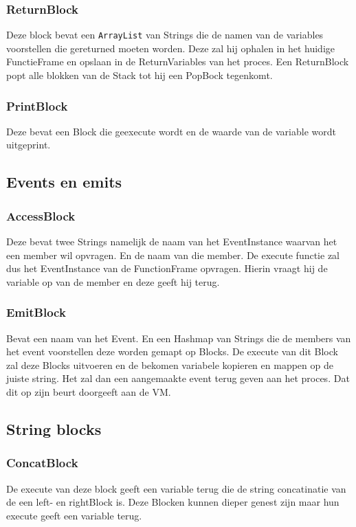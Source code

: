 \documentclass[]{article}
\begin{document}
\subsubsection{ReturnBlock}
Deze block bevat een \texttt{ArrayList} \cite{arraylist} van Strings die de namen van de variables voorstellen die gereturned moeten worden. Deze zal hij ophalen in het huidige FunctieFrame en opslaan in de ReturnVariables van het proces. Een ReturnBlock popt alle blokken van de Stack tot hij een PopBock tegenkomt.
\subsubsection{PrintBlock}
Deze bevat een Block die geexecute wordt en de waarde van de variable wordt uitgeprint.

\subsection{Events en emits}
\subsubsection{AccessBlock}
 Deze bevat twee Strings namelijk de naam van het EventInstance waarvan het een member wil opvragen. En de naam van die member. De execute functie zal dus het EventInstance van de FunctionFrame opvragen. Hierin vraagt hij de variable op van de member en deze geeft hij terug.
\subsubsection{EmitBlock}
Bevat een naam van het Event. En een Hashmap \cite{hashmap} van Strings die de members van het event voorstellen deze worden gemapt op Blocks. De execute van dit Block zal deze Blocks uitvoeren en de bekomen variabele kopieren en mappen op de juiste string. Het zal dan een aangemaakte event terug geven aan het proces. Dat dit op zijn beurt doorgeeft aan de VM.

\subsection{String blocks}
\subsubsection{ConcatBlock}
De execute van deze block geeft een variable terug die de string concatinatie van de een left- en rightBlock is. Deze Blocken kunnen dieper genest zijn maar hun execute geeft een variable terug.
\end{document}
